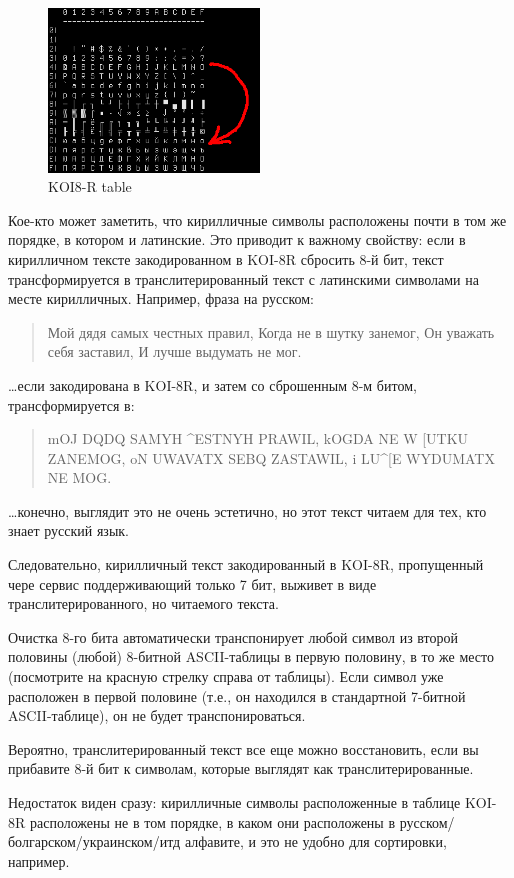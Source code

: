 \begin{figure}[H]
\centering
\includegraphics[width=0.5\textwidth]{fundamentals/koi8r.png}
\caption{KOI8-R table}
\end{figure}

Кое-кто может заметить, что кирилличные символы расположены почти в том же порядке, в котором и латинские.
Это приводит к важному свойству: если в кирилличном тексте закодированном в KOI-8R сбросить 8-й бит,
текст трансформируется в транслитерированный текст с латинскими символами на месте кирилличных.
Например, фраза на русском:

\begin{framed}
\begin{quotation}
Мой дядя самых честных правил, Когда не в шутку занемог, Он уважать себя заставил, И лучше выдумать не мог.
\end{quotation}
\end{framed}

\dots если закодирована в KOI-8R, и затем со сброшенным 8-м битом, трансформируется в:

\begin{framed}
\begin{quotation}
mOJ DQDQ SAMYH \^{}ESTNYH PRAWIL, kOGDA NE W [UTKU ZANEMOG, oN UWAVATX SEBQ ZASTAWIL, i LU\^{}[E WYDUMATX NE MOG.
\end{quotation}
\end{framed}

\dots конечно, выглядит это не очень эстетично, но этот текст читаем для тех, кто знает русский язык.

Следовательно, кирилличный текст закодированный в KOI-8R, пропущенный чере сервис поддерживающий только 7 бит,
выживет в виде транслитерированного, но читаемого текста.

Очистка 8-го бита автоматически транспонирует любой символ из второй половины (любой) 8-битной \ac{ASCII}-таблицы
в первую половину, в то же место (посмотрите на красную стрелку справа от таблицы).
Если символ уже расположен в первой половине (т.е., он находился в стандартной 7-битной \ac{ASCII}-таблице),
он не будет транспонироваться.

Вероятно, транслитерированный текст все еще можно восстановить, если вы прибавите 8-й бит к символам,
которые выглядят как транслитерированные.

Недостаток виден сразу: кирилличные символы расположенные в таблице KOI-8R расположены не в том порядке,
в каком они расположены в русском/болгарском/украинском/итд алфавите, и это не удобно для сортировки, например.

